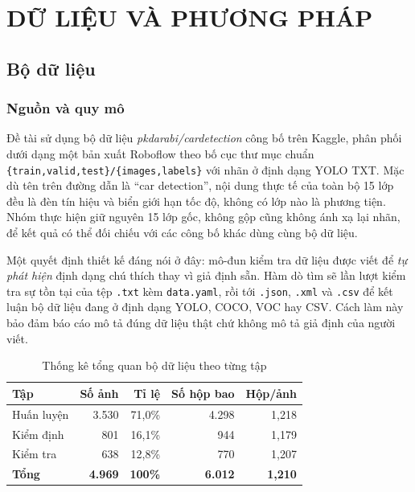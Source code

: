 \chapter{DỮ LIỆU VÀ PHƯƠNG PHÁP}
\label{ch:phuong_phap}

\section{Bộ dữ liệu}

\subsection{Nguồn và quy mô}

Đề tài sử dụng bộ dữ liệu \textit{pkdarabi/cardetection} công bố trên Kaggle, phân phối dưới dạng
một bản xuất Roboflow theo bố cục thư mục chuẩn \texttt{\{train,valid,test\}/\{images,labels\}}
với nhãn ở định dạng YOLO TXT. Mặc dù tên trên đường dẫn là ``car detection'', nội dung thực tế
của toàn bộ 15 lớp đều là đèn tín hiệu và biển giới hạn tốc độ, không có lớp nào là phương tiện.
Nhóm thực hiện giữ nguyên 15 lớp gốc, không gộp cũng không ánh xạ lại nhãn, để kết quả có thể đối
chiếu với các công bố khác dùng cùng bộ dữ liệu.

Một quyết định thiết kế đáng nói ở đây: mô-đun kiểm tra dữ liệu được viết để \emph{tự phát hiện}
định dạng chú thích thay vì giả định sẵn. Hàm dò tìm sẽ lần lượt kiểm tra sự tồn tại của tệp
\texttt{.txt} kèm \texttt{data.yaml}, rồi tới \texttt{.json}, \texttt{.xml} và \texttt{.csv} để
kết luận bộ dữ liệu đang ở định dạng YOLO, COCO, VOC hay CSV. Cách làm này bảo đảm báo cáo mô tả
đúng dữ liệu thật chứ không mô tả giả định của người viết.

\begin{table}[H]
\centering
\caption{Thống kê tổng quan bộ dữ liệu theo từng tập}
\label{tab:dataset_summary}
\small
\begin{tabular}{lrrrr}
\toprule
\textbf{Tập} & \textbf{Số ảnh} & \textbf{Tỉ lệ} & \textbf{Số hộp bao} & \textbf{Hộp/ảnh} \\
\midrule
Huấn luyện & 3.530 & 71,0\% & 4.298 & 1,218 \\
Kiểm định  & 801   & 16,1\% & 944   & 1,179 \\
Kiểm tra   & 638   & 12,8\% & 770   & 1,207 \\
\midrule
\textbf{Tổng} & \textbf{4.969} & \textbf{100\%} & \textbf{6.012} & \textbf{1,210} \\
\bottomrule
\end{tabular}
\end{table}

